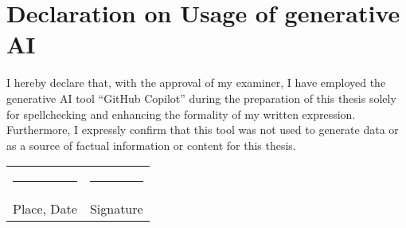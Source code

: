 \chapter*{Declaration on Usage of generative AI}

I hereby declare that, with the approval of my examiner, I have
employed the generative AI tool \enquote{GitHub Copilot} during the
preparation of this thesis solely for spellchecking and enhancing the
formality of my written expression. Furthermore, I expressly confirm
that this tool was not used to generate data or as a source of
factual information or content for this thesis.\\[3\normalbaselineskip]
\begin{tabular}{p{} l}
      \rule{\textwidth/3}{0.4pt} & \rule{\textwidth/3}{0.4pt} \\
      Place, Date                & Signature
\end{tabular}